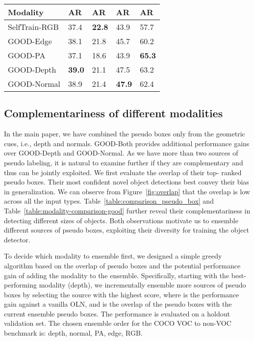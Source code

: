 \documentclass{article} \usepackage{iclr2023_conference,times}
\begin{document}
\begin{table*}[!thbp]
	\begin{center}
\begin{tabular}{l|l|l|l|l}
						\toprule
						Modality &  AR & AR  &  AR  & AR  \\ \midrule
       SelfTrain-RGB  & 37.4  & \textbf{22.8} &	43.9 &	57.7 \\ 
GOOD-Edge & 38.1	& 21.8	& 45.7	& 60.2 \\
                             GOOD-PA  & 37.1 & 18.6 & 43.9 & \textbf{65.3} \\
                             GOOD-Depth   &   \textbf{39.0} & 	21.1 &	47.5	 & 63.2\\ 
                             GOOD-Normal &  38.9	& 21.4	& \textbf{47.9} & 62.4 \\
                    \bottomrule
						\end{tabular}
\end{center}
	\caption{\textbf{Comparison of GOOD using different modalities on COCO VOC to non-VOC benchmark.} }
	\label{table:modality-comparison-good}
\end{table*}


\subsection{Complementariness of different modalities}

In the main paper, we have combined the pseudo boxes only from the geometric cues, i.e., depth and normals. GOOD-Both provides additional performance gains over GOOD-Depth and GOOD-Normal. As we have more than two sources of pseudo labeling, it is natural to examine further if they are complementary and thus can be jointly exploited. We first evaluate the overlap of their top- ranked pseudo boxes. Their most confident novel object detections best convey their bias in generalization. We can observe from Figure~\ref{fig:overlap} that the overlap is low across all the input types. Table~\ref{table:comparison_pseudo_box} and Table~\ref{table:modality-comparison-good} further reveal their complementariness in detecting different sizes of objects. Both observations motivate us to ensemble different sources of pseudo boxes, exploiting their diversity for training the object detector. 

To decide which modality to ensemble first, we designed a simple greedy algorithm based on the overlap of pseudo boxes and the potential performance gain of adding the modality to the ensemble. 
Specifically, starting with the best-performing modality (depth), we incrementally ensemble more sources of pseudo boxes by selecting the source with the highest   score, where  is the performance gain against a vanilla OLN, and  is the overlap of the pseudo boxes with the current ensemble pseudo boxes. The performance is evaluated on a holdout validation set. The chosen ensemble order for the COCO VOC to non-VOC benchmark is: depth, normal, PA, edge, RGB.
\end{document}
